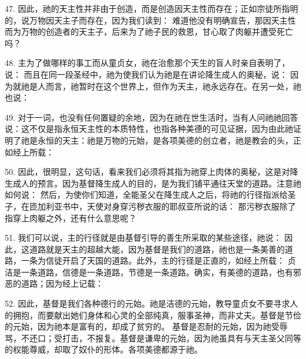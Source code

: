 47. 因此，祂的天主性并非由于创造，而是创造因天主性而存在；正如宗徒所指明的，说万物因天主子而存在，因为我们读到：  难道他没有明确宣告，那因天主性而为万物的创造者的天主子，后来为了祂子民的救恩，甘心取了肉躯并遭受死亡吗？\par

48. 主为了做哪样的事工而从童贞女，祂在治愈那个天生的盲人时亲自表明了，说： 而且在同一段圣经中，祂为使我们认为祂是在讲论降生成人的奥秘，说： 因为就祂是人而言，祂暂时在这个世界上，但作为天主，祂永远存在。在另一处，祂也说：\par

49. 对于一词，也没有任何置疑的余地，因为在祂在世生活时，当有人问祂祂回答说：这不仅是指永恒天主性的本质特性，也指各种美德的可见证据，因为由此祂证明了祂是永恒的天主：祂是万物的元始，是各项美德的创立者，祂是教会的头，正如经上所载： \par

50. 因此，很明显，这句话，看来我们必须将其指为祂穿上肉体的奥秘，这是对降生成人的预言。因为基督降生成人的目的，是为我们铺平通往天堂的道路。注意祂如何说： 然后，为使你们知道，全能圣父在降生成人之后，将祂的行径指派给圣子，在匝加利亚书中，天使对身穿污秽衣服的耶叔亚所说的话： 那污秽衣服除了指穿上肉躯之外，还有什么意思呢？\par

51. 我们可以说，主的行径就是由基督引导的善生所采取的某些途径，祂说： 因此，这道路就是天主的超越大能，因为基督是我们的道路，祂也是一条美善的道路，一条为信徒开启了天国的道路。此外，主的行径是正直的，如经上所载： 贞洁是一条道路，信德是一条道路，节德是一条道路。确实，有美德的道路，也有邪恶的道路；因为经上记载：\par

52. 因此，基督是我们各种德行的元始。祂是洁德的元始，教导童贞女不要寻求人的拥抱，而要献出她们身体和心灵的全部纯真，服事圣神，而非丈夫。基督是节俭的元始，因为祂本是富有的，却成了贫穷的。 基督是忍耐的元始，因为祂受辱骂，不还口；受打击，不报复。基督是谦卑的元始，因为祂虽具有与天主圣父同等的权能尊威，却取了奴仆的形体。各项美德都源于祂。\par

